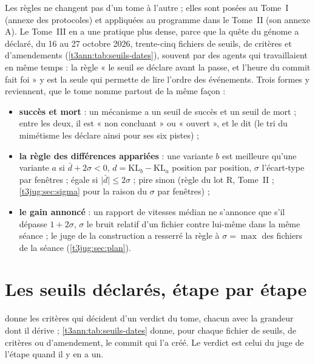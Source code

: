 Les règles ne changent pas d'un tome à l'autre ; elles sont posées au Tome~I (annexe des protocoles) et appliquées au programme dans le Tome~II (son annexe A). Le Tome~III en a une pratique plus dense, parce que la quête du génome a déclaré, du 16 au 27 octobre 2026, trente-cinq fichiers de seuils, de critères et d'amendements (\cref{t3ann:tab:seuils-dates}), souvent par des agents qui travaillaient en même temps : la règle « le seuil se déclare avant la passe, et l'heure du commit fait foi » y est la seule qui permette de lire l'ordre des événements. Trois formes y reviennent, que le tome nomme partout de la même façon :
\begin{itemize}
\item \textbf{succès et mort} : un mécanisme a un seuil de succès et un seuil de mort ; entre les deux, il est « non concluant » ou « ouvert », et le dit (le tri du mimétisme les déclare ainsi pour ses six pistes) ;
\item \textbf{la règle des différences appariées} : une variante $b$ est meilleure qu'une variante $a$ si $\bar d + 2\sigma < 0$, $d = \mathrm{KL}_b - \mathrm{KL}_a$ position par position, $\sigma$ l'écart-type par fenêtres ; égale si $\lvert \bar d\rvert \le 2\sigma$ ; pire sinon (règle du lot R, Tome~II ; \cref{t3jug:sec:sigma} pour la raison du $\sigma$ par fenêtres) ;
\item \textbf{le gain annoncé} : un rapport de vitesses médian ne s'annonce que s'il dépasse $1 + 2\sigma$, $\sigma$ le bruit relatif d'un fichier contre lui-même dans la même séance ; le juge de la construction a resserré la règle à $\sigma = \max$ des fichiers de la séance (\cref{t3jug:sec:plan}).
\end{itemize}

\section{Les seuils déclarés, étape par étape}\label{t3ann:sec:seuils}

 donne les critères qui décident d'un verdict du tome, chacun avec la grandeur dont il dérive ; \cref{t3ann:tab:seuils-dates} donne, pour chaque fichier de seuils, de critères ou d'amendement, le commit qui l'a créé. Le verdict est celui du juge de l'étape quand il y en a un.

